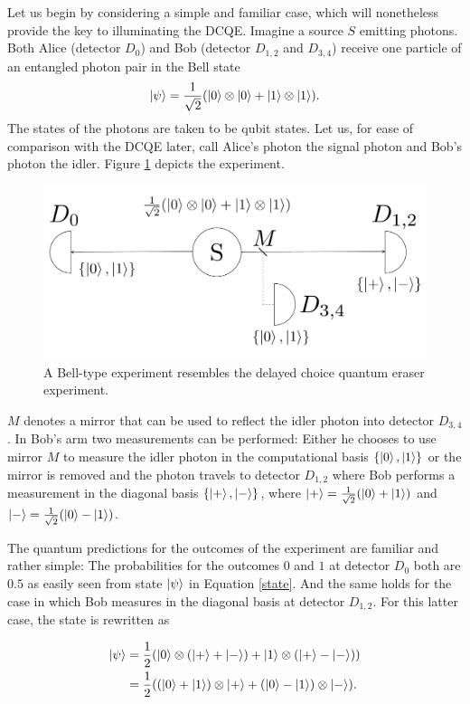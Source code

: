 \documentclass[12pt]{article}
\numberwithin{equation}{section}
\begin{document}
Let us begin by considering a simple and familiar case, which will nonetheless provide the key to illuminating the DCQE. Imagine a source $S$ emitting photons. Both Alice (detector $D_0$) and Bob (detector $D_{1,2}$ and $D_{3,4}$) receive one particle of an entangled photon pair in the Bell state
\begin{equation}
\label{state}
\ket{\psi}=\frac{1}{\sqrt{2}}(\ket{0}\otimes\ket{0}+\ket{1}\otimes\ket{1}).
\end{equation} 
The states of the photons are taken to be qubit states. Let us, for ease of comparison with the DCQE later, call Alice's photon the signal photon and Bob's photon the idler. Figure \ref{fig:BellD} depicts the experiment.
\begin{figure}[H]
\centering
\includegraphics[width=0.7\linewidth]{./BellD.pdf}
\caption{A Bell-type experiment resembles the delayed choice quantum eraser experiment.}
\label{fig:BellD}
\end{figure}

$M$ denotes a mirror that can be used to reflect the idler photon into detector $D_{3,4}$. In Bob's arm two measurements can be performed: Either he chooses to use mirror $M$ to measure the idler photon in the computational basis $\{\ket{0},\ket{1}\}$ or the mirror is removed and the photon travels to detector $D_{1,2}$ where Bob performs a measurement in the diagonal basis  $\{\ket{+},\ket{-}\}$, where $\ket{+}=\frac{1}{\sqrt{2}}(\ket{0}+\ket{1})$ and $\ket{-}=\frac{1}{\sqrt{2}}(\ket{0}-\ket{1})$. 

The quantum predictions for the outcomes of the experiment are familiar and rather simple: The probabilities for the outcomes $0$ and $1$ at detector $D_0$ both are $0.5$ as easily seen from state $\ket{\psi}$ in Equation \ref{state}. And the same holds for the case in which Bob measures in the diagonal basis at detector $D_{1,2}$. For this latter case, the state is rewritten as   

\begin{align}
\label{eraser state}
\ket{\psi} &=\frac{1}{2}(\ket{0}\otimes(\ket{+}+\ket{-})+\ket{1}\otimes(\ket{+}-\ket{-})) \nonumber\\
& =
\frac{1}{2}((\ket{0}+\ket{1})\otimes\ket{+}+(\ket{0}-\ket{1})\otimes\ket{-}).
\end{align}
\end{document}
